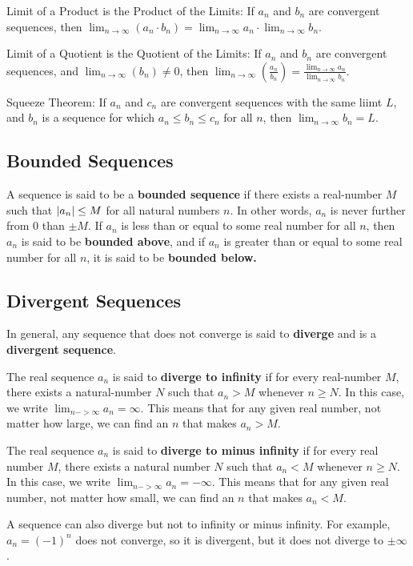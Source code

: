 \documentclass{article}
\begin{document}
Limit of a Product is the Product of the Limits: If $a_n$ and $b_n$ are convergent sequences, then $\lim_{n \to \infty}{(a_n \cdot b_n)} = \lim_{n \to \infty}{a_n} \cdot \lim_{n \to \infty}{b_n}$.

Limit of a Quotient is the Quotient of the Limits: If $a_n$ and $b_n$ are convergent sequences, and $\lim_{n \to \infty}{(b_n)} \neq 0$, then $\lim_{n \to \infty}{(\frac{a_n}{b_n})} = \frac{\lim_{n \to \infty}{a_n}}{\lim_{n \to \infty}{b_n}}$.

Squeeze Theorem: If $a_n$ and $c_n$ are convergent sequences with the same liimt $L$, and $b_n$ is a sequence for which $a_n \leq b_n \leq c_n$ for all $n$, then $\lim_{n \to \infty}{b_n} = L$.

\subsection{Bounded Sequences}
A sequence is said to be a \textbf{bounded sequence} if there exists a \@{real-number} $M$ such that $\left| a_n \right| \leq M$ for all natural numbers $n$. In other words, $a_n$ is never further from $0$ than $\pm M$. If $a_n$ is less than or equal to some real number for all $n$, then $a_n$ is said to be \textbf{bounded above}, and if $a_n$ is greater than or equal to some real number for all $n$, it is said to be \textbf{bounded below.}

\subsection{Divergent Sequences}
In general, any sequence that does not \@{converge} is said to \textbf{diverge} and is a \textbf{divergent sequence}.

The real sequence $a_n$ is said to \textbf{diverge to infinity} if for every \@{real-number} $M$, there exists a \@{natural-number} $N$ such that $a_n > M$ whenever $n \geq N.$ In this case, we write $\lim_{n->\infty}{a_n} = \infty$. This means that for any given real number, not matter how large, we can find an $n$ that makes $a_n > M$.  

The real sequence $a_n$ is said to \textbf{diverge to minus infinity} if for every real number $M$, there exists a natural number $N$ such that $a_n < M$ whenever $n \geq N.$ In this case, we write $\lim_{n->\infty}{a_n} = -\infty$. This means that for any given real number, not matter how small, we can find an $n$ that makes $a_n < M$. 

A sequence can also diverge but not to infinity or minus infinity. For example, $a_n = (-1)^n$ does not converge, so it is divergent, but it does not diverge to $\pm \infty$.
\end{document}

